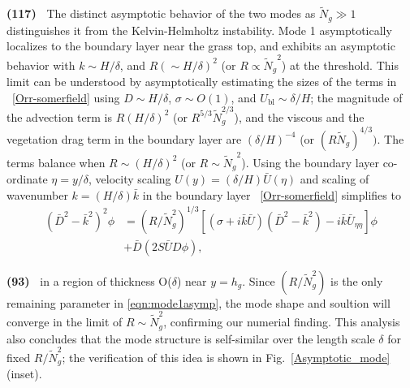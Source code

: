 \documentclass[aps,prl,reprint,twocolumn,superscriptaddress,sort&compress,10pt]{revtex4-1}  %
\newcommand{\hg}{h_g}
\newcommand{\Rey}{{R}}
\newcommand{\Ndg}{\tilde{N}_g}
\newcommand{\ubl}{U_\text{bl}}
\newcommand{\words}[1]{\textbf{(#1)~}}
\begin{document}
\words{117} The distinct asymptotic behavior of the two modes as $\Ndg \gg 1$ distinguishes it from the Kelvin-Helmholtz instability. 
Mode 1 asymptotically localizes to the boundary layer near the grass top, and exhibits an asymptotic behavior with $k \sim H/\delta$, and $\Rey (\sim H/\delta)^2$ (or $\Rey \propto {\Ndg}^{2}$) at the threshold. 
This limit can be understood by asymptotically estimating the sizes of the terms in ~\eqref{Orr-somerfield} using $D\sim H/\delta$, $\sigma \sim O(1)$, and $\ubl \sim \delta/H$; the magnitude of the advection term is $\Rey (H/\delta)^2$  (or $\Rey^{5/3} \Ndg^{2/3}$), and the viscous and the vegetation drag term in the boundary layer are $(\delta/H)^{-4}$ (or $(\Rey \Ndg)^{4/3})$. 
The terms balance when $\Rey \sim (H/\delta)^2$ (or $\Rey \sim {\Ndg}^{2}$). Using the boundary layer co-ordinate $\eta = y/\delta$, velocity scaling 
$U(y) = (\delta/H)\bar{U}(\eta)$ and scaling of wavenumber $k = (H/\delta) \bar{k}$ in the boundary layer ~\eqref{Orr-somerfield} simplifies to
\begin{equation}
\begin{split}
\left(\bar{D}^2 -\bar{k}^{2} \right)^2\phi &= (\Rey/\Ndg^2)^{1/3} \left[ \left({\sigma}+i\bar{k}\bar{U}\right) \left(\bar{D}^2-\bar{k}^2\right) -i\bar{k}\bar{U}_{\eta\eta}\right]\phi \\
&+\bar{D}\left(2S \bar{U} D \phi\right),
\label{eqn:mode1asymp}
\end{split}
\end{equation}

\words{93} in a region of thickness O($\delta$) near $y=\hg$. Since $(\Rey/\Ndg^2)$ is the only remaining parameter in \eqref{eqn:mode1asymp}, the mode shape and soultion will converge in the limit of $R \sim \Ndg^2$, confirming our numerial finding.
This analysis also concludes that the mode structure is self-similar over the length scale $\delta$ for fixed $\Rey/\Ndg^{2}$; the verification of this idea is shown in Fig.~\ref{Asymptotic_mode} (inset).
\end{document}

